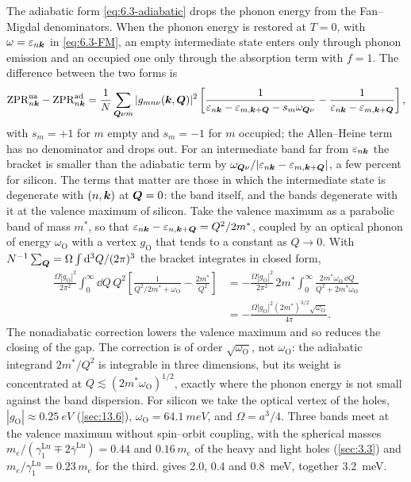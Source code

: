 The adiabatic form \cref{eq:6.3-adiabatic} drops the phonon energy from the Fan--Migdal denominators. When the phonon energy is restored at $T = 0$, with $\omega = \varepsilon_{n\bm{k}}$ in \cref{eq:6.3-FM}, an empty intermediate state enters only through phonon emission and an occupied one only through the absorption term with $f = 1$. The difference between the two forms is
\begin{equation}
  \mathrm{ZPR}^{\mathrm{na}}_{n\bm{k}} - \mathrm{ZPR}^{\mathrm{ad}}_{n\bm{k}} = \frac1N\sum_{\bm{Q}\nu m}|g_{mn\nu}(\bm{k},\bm{Q})|^2
  \left[\frac{1}{\varepsilon_{n\bm{k}} - \varepsilon_{m,\bm{k}+\bm{Q}} - s_m\omega_{\bm{Q}\nu}} - \frac{1}{\varepsilon_{n\bm{k}} - \varepsilon_{m,\bm{k}+\bm{Q}}}\right] ,
  \label{eq:13.7-na}
\end{equation}
with $s_m = +1$ for $m$ empty and $s_m = -1$ for $m$ occupied; the Allen--Heine term has no denominator and drops out. For an intermediate band far from $\varepsilon_{n\bm{k}}$ the bracket is smaller than the adiabatic term by $\omega_{\bm{Q}\nu}/|\varepsilon_{n\bm{k}} - \varepsilon_{m,\bm{k}+\bm{Q}}|$, a few percent for silicon. The terms that matter are those in which the intermediate state is degenerate with $(n,\bm{k})$ at $\bm{Q} = 0$: the band itself, and the bands degenerate with it at the valence maximum of silicon. Take the valence maximum as a parabolic band of mass $m^*$, so that $\varepsilon_{n\bm{k}} - \varepsilon_{n,\bm{k}+\bm{Q}} = Q^2/2m^*$, coupled by an optical phonon of energy $\omega_{\mathrm{O}}$ with a vertex $g_{\mathrm{O}}$ that tends to a constant as $Q \to 0$. With $N^{-1}\sum_{\bm{Q}} = \Omega\int\mathrm{d}^3Q/(2\pi)^3$ the bracket integrates in closed form,
\begin{equation}
  \begin{aligned}
  \frac{\Omega|g_{\mathrm{O}}|^2}{2\pi^2}\int_0^\infty\dd Q\,Q^2\left[\frac{1}{Q^2/2m^* + \omega_{\mathrm{O}}} - \frac{2m^*}{Q^2}\right]
  &= -\frac{\Omega|g_{\mathrm{O}}|^2}{2\pi^2}\,2m^*\int_0^\infty\frac{2m^*\omega_{\mathrm{O}}\,\dd Q}{Q^2 + 2m^*\omega_{\mathrm{O}}} \\
  &= -\frac{\Omega|g_{\mathrm{O}}|^2(2m^*)^{3/2}\sqrt{\omega_{\mathrm{O}}}}{4\pi} .
  \end{aligned}
  \label{eq:13.7-sqrt}
\end{equation}
The nonadiabatic correction lowers the valence maximum and so reduces the closing of the gap. The correction is of order $\sqrt{\omega_{\mathrm{O}}}$, not $\omega_{\mathrm{O}}$: the adiabatic integrand $2m^*/Q^2$ is integrable in three dimensions, but its weight is concentrated at $Q \lesssim (2m^*\omega_{\mathrm{O}})^{1/2}$, exactly where the phonon energy is not small against the band dispersion. For silicon we take the optical vertex of the holes, $|g_{\mathrm{O}}| \approx \SI{0.25}{eV}$ (\cref{sec:13.6}), $\omega_{\mathrm{O}} = \SI{64.1}{meV}$, and $\Omega = a^3/4$. Three bands meet at the valence maximum without spin--orbit coupling, with the spherical masses $m_e/(\gamma^{\mathrm{Lu}}_1 \mp 2\bar\gamma^{\mathrm{Lu}}) = 0.44$ and $0.16\,m_e$ of the heavy and light holes (\cref{sec:3.3}) and $m_e/\gamma^{\mathrm{Lu}}_1 = 0.23\,m_e$ for the third.  gives 2.0, 0.4 and \SI{0.8}{meV}, together \SI{3.2}{meV}.

